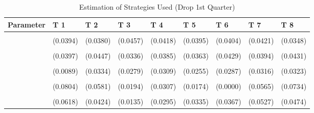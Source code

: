 \begin{table}[!h]
\centering
\caption{Estimation of Strategies Used (Drop 1st Quarter)}
\centering
\begin{tabular}[t]{lllllllll}
\toprule
Parameter & T 1 & T 2 & T 3 & T 4 & T 5 & T 6 & T 7 & T 8\\
\midrule
\cellcolor{gray!10}{gamma} & \cellcolor{gray!10}{0.7151***} & \cellcolor{gray!10}{0.6401***} & \cellcolor{gray!10}{0.6800***} & \cellcolor{gray!10}{0.7046***} & \cellcolor{gray!10}{0.6465***} & \cellcolor{gray!10}{0.7393***} & \cellcolor{gray!10}{0.7032***} & \cellcolor{gray!10}{0.7322***}\\
 & (0.0394) & (0.0380) & (0.0457) & (0.0418) & (0.0395) & (0.0404) & (0.0421) & (0.0348)\\
\cellcolor{gray!10}{AD} & \cellcolor{gray!10}{0.4508***} & \cellcolor{gray!10}{0.3350***} & \cellcolor{gray!10}{0.7905***} & \cellcolor{gray!10}{0.6570***} & \cellcolor{gray!10}{0.7412***} & \cellcolor{gray!10}{0.7197***} & \cellcolor{gray!10}{0.3380***} & \cellcolor{gray!10}{0.3264***}\\
 & (0.0397) & (0.0447) & (0.0336) & (0.0385) & (0.0363) & (0.0429) & (0.0394) & (0.0431)\\
\cellcolor{gray!10}{AC} & \cellcolor{gray!10}{0.0000} & \cellcolor{gray!10}{0.1137***} & \cellcolor{gray!10}{0.1134***} & \cellcolor{gray!10}{0.1309***} & \cellcolor{gray!10}{0.0862***} & \cellcolor{gray!10}{0.1027***} & \cellcolor{gray!10}{0.1640***} & \cellcolor{gray!10}{0.1628***}\\
\addlinespace
 & (0.0089) & (0.0334) & (0.0279) & (0.0309) & (0.0255) & (0.0287) & (0.0316) & (0.0323)\\
\cellcolor{gray!10}{G} & \cellcolor{gray!10}{0.1232} & \cellcolor{gray!10}{0.2655***} & \cellcolor{gray!10}{0.0413*} & \cellcolor{gray!10}{0.0610*} & \cellcolor{gray!10}{0.0273} & \cellcolor{gray!10}{0.0000} & \cellcolor{gray!10}{0.1442*} & \cellcolor{gray!10}{0.3016***}\\
 & (0.0804) & (0.0581) & (0.0194) & (0.0307) & (0.0174) & (0.0000) & (0.0565) & (0.0734)\\
\cellcolor{gray!10}{TFT} & \cellcolor{gray!10}{0.2825***} & \cellcolor{gray!10}{0.0945*} & \cellcolor{gray!10}{0.0071} & \cellcolor{gray!10}{0.0869**} & \cellcolor{gray!10}{0.0983**} & \cellcolor{gray!10}{0.1045**} & \cellcolor{gray!10}{0.2153***} & \cellcolor{gray!10}{0.1281**}\\
 & (0.0618) & (0.0424) & (0.0135) & (0.0295) & (0.0335) & (0.0367) & (0.0527) & (0.0474)\\

\end{tabular}
\end{table}
